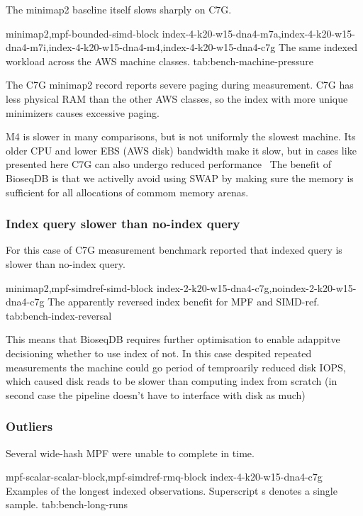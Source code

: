 The minimap2 baseline itself slows sharply on C7G.

  {minimap2,mpf-bounded-simd-block}
  {index-4-k20-w15-dna4-m7a,index-4-k20-w15-dna4-m7i,index-4-k20-w15-dna4-m4,index-4-k20-w15-dna4-c7g}
  {The same indexed workload across the AWS machine classes.}
  {tab:bench-machine-pressure}

The C7G minimap2 record reports severe paging during measurement.
C7G has less physical RAM than
the other AWS classes, so the index with more unique minimizers causes excessive paging.

M4 is slower in many comparisons, but is not uniformly the slowest machine.
Its older CPU and lower EBS (AWS disk) bandwidth make it slow, but in cases like presented here C7G can also undergo reduced performance~\autocite{aws_ebs_limits}
The benefit of BioseqDB is that we activelly avoid using SWAP by making sure the memory is sufficient for all allocations of commom memory arenas.

\subsubsection{Index query slower than no-index query}
\label{sec:bench-index-reversal}

For this case of C7G measurement benchmark reported that indexed query is slower than no-index query.

  {minimap2,mpf-simdref-simd-block}
  {index-2-k20-w15-dna4-c7g,noindex-2-k20-w15-dna4-c7g}
  {The apparently reversed index benefit for MPF and SIMD-ref.}
  {tab:bench-index-reversal}

This means that BioseqDB requires further optimisation to enable adappitve decisioning whether to use index of not. In this case despited repeated measurements the machine could go 
period of temproarily reduced disk IOPS, which caused disk reads to be slower than computing index from scratch (in second case the pipeline doesn't have to interface with disk as much)

\subsubsection{Outliers}
\label{sec:bench-long-runs}

Several wide-hash MPF were unable to complete in time.

  {mpf-scalar-scalar-block,mpf-simdref-rmq-block}
  {index-4-k20-w15-dna4-c7g}
  {Examples of the longest indexed observations. Superscript s denotes a single sample.}
  {tab:bench-long-runs}

